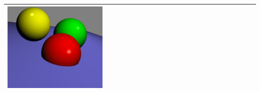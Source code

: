 \begin{table}[H]
\begin{tabular}{p{}p{}}
            \includegraphics[width=0.4\textwidth]{img/phong_phong_shading_example.pdf} \newline \\
        \bottomrule
    \end{tabular}
\end{table}

